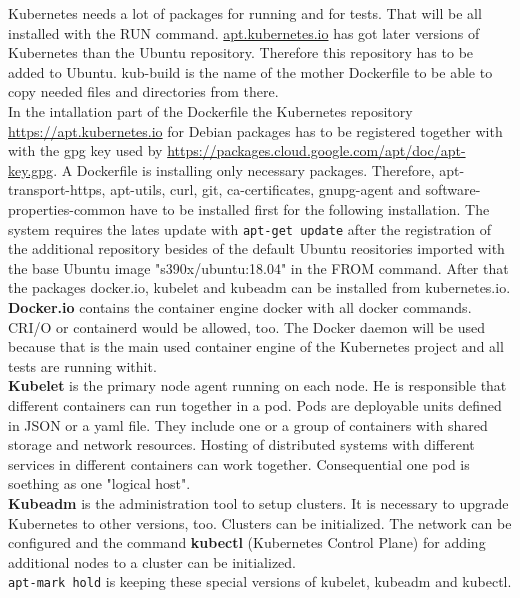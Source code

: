 Kubernetes needs a lot of packages for running and for tests. That will be all installed with the RUN command.
\url{apt.kubernetes.io} has got later versions of Kubernetes than the Ubuntu repository. Therefore this repository has to be added to Ubuntu. kub-build is the name of the mother Dockerfile to be able to copy needed files and directories from there. \\
In the intallation part of the Dockerfile the Kubernetes repository \url{https://apt.kubernetes.io} for Debian packages has to be registered together with with the gpg key used by  \url{https://packages.cloud.google.com/apt/doc/apt-key.gpg}.
 A Dockerfile is installing only necessary packages. Therefore, apt-transport-https, apt-utils, curl, git, ca-certificates, gnupg-agent and software-properties-common have to be installed first for the following installation.
The system requires the lates update with \lstinline!apt-get update! after the registration of the additional repository besides of the default Ubuntu reositories imported with the base Ubuntu image "s390x/ubuntu:18.04" in the FROM command. After that the packages docker.io, kubelet and kubeadm can be installed from kubernetes.io. \textbf{Docker.io} contains the container engine docker with all docker commands. CRI/O or containerd would be allowed, too. The Docker daemon will be used because that is the main used container engine of the Kubernetes project and all tests are running withit. \\ \textbf{Kubelet} is the primary node agent running on each node. He is responsible that different containers can run together in a pod. Pods are deployable units defined in JSON or a yaml file. They include one or a group of containers with shared storage and network resources. Hosting of distributed systems  with different services in different containers can work together. Consequential one pod is soething as one "logical host". \\
\textbf{Kubeadm} is the administration tool to setup clusters. It is necessary to upgrade Kubernetes to other versions, too. Clusters can be initialized. The network can be configured and the command \textbf{kubectl} (Kubernetes Control Plane) for adding additional nodes to a cluster can be initialized. \\
\lstinline!apt-mark hold! is keeping these special versions of kubelet, kubeadm and kubectl. 

